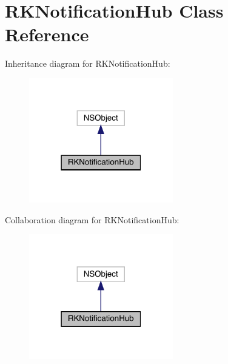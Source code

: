 \hypertarget{interface_r_k_notification_hub}{}\section{R\+K\+Notification\+Hub Class Reference}
\label{interface_r_k_notification_hub}


Inheritance diagram for R\+K\+Notification\+Hub\+:\nopagebreak
\begin{figure}[H]
\begin{center}
\leavevmode
\includegraphics[width=178pt]{interface_r_k_notification_hub__inherit__graph}
\end{center}
\end{figure}


Collaboration diagram for R\+K\+Notification\+Hub\+:\nopagebreak
\begin{figure}[H]
\begin{center}
\leavevmode
\includegraphics[width=178pt]{interface_r_k_notification_hub__coll__graph}
\end{center}
\end{figure}
